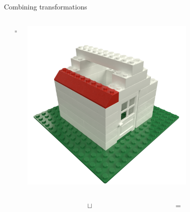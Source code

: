 \begin{frame}{Combining transformations}
\begin{columns}[c]
\begin{column}{0.2\textwidth}
        \end{column}\begin{column}{0.05\textwidth}
            \centering
            =
        \end{column}\begin{column}{0.3\textwidth}
            \centering
            \includegraphics[width=0.7\textwidth]{images/03_transformation_framework/lego_house_roof_step.png}
        \end{column}
    \end{columns}
    \begin{columns}[c]
        \begin{column}{0.05\textwidth}
        \end{column}\begin{column}{0.3\textwidth}
            \centering
        \end{column}\begin{column}{0.05\textwidth}
            \centering
            $\sqcup$
        \end{column}\begin{column}{0.2\textwidth}
            \centering
        \end{column}\begin{column}{0.05\textwidth}
            \centering
            =
        \end{column}\begin{column}{0.3\textwidth}
            \centering
        \end{column}
    \end{columns} 

\end{frame}
